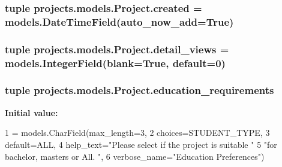 \hypertarget{classprojects_1_1models_1_1_project_a0acca6def6fef352cf9af652a74461ab}{
\subsubsection[{created}]{\setlength{\rightskip}{0pt plus 5cm}tuple projects.\-models.\-Project.\-created = models.\-Date\-Time\-Field(auto\-\_\-now\-\_\-add=True)\hspace{0.3cm}{\ttfamily [static]}}}\label{classprojects_1_1models_1_1_project_a0acca6def6fef352cf9af652a74461ab}
\hypertarget{classprojects_1_1models_1_1_project_a0a82dba36ca5ebbab78b5d58400ea2f3}{
\subsubsection[{detail\-\_\-views}]{\setlength{\rightskip}{0pt plus 5cm}tuple projects.\-models.\-Project.\-detail\-\_\-views = models.\-Integer\-Field(blank=True, default=0)\hspace{0.3cm}{\ttfamily [static]}}}\label{classprojects_1_1models_1_1_project_a0a82dba36ca5ebbab78b5d58400ea2f3}
\hypertarget{classprojects_1_1models_1_1_project_af15ee9371804f4cc5dccd92761763aa2}{
\subsubsection[{education\-\_\-requirements}]{\setlength{\rightskip}{0pt plus 5cm}tuple projects.\-models.\-Project.\-education\-\_\-requirements\hspace{0.3cm}{\ttfamily [static]}}}\label{classprojects_1_1models_1_1_project_af15ee9371804f4cc5dccd92761763aa2}
{\bfseries Initial value\-:}
\begin{DoxyCode}
1 = models.CharField(max\_length=3,
2                                               choices=STUDENT\_TYPE,
3                                               default=ALL,
4                                               help\_text=\textcolor{stringliteral}{"Please select if the project is suitable "}
5                                                         \textcolor{stringliteral}{"for bachelor, masters or All. "},
6                                               verbose\_name=\textcolor{stringliteral}{"Education Preferences"})
\end{DoxyCode}
